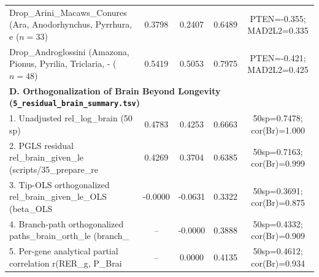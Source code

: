 \documentclass[9pt,a4paper]{article}
\begin{document}
\begin{longtable}{p{6.5cm}cccc}
Drop\_Arini\_Macaws\_Conures (Ara, Anodorhynchus, Pyrrhura, e ($n=33$) & 0.3798 & 0.2407 & 0.6489 & PTEN=-0.355; MAD2L2=0.335 \\
Drop\_Androglossini (Amazona, Pionus, Pyrilia, Triclaria, - ($n=48$) & 0.5419 & 0.5053 & 0.7975 & PTEN=-0.421; MAD2L2=0.425 \\
\midrule\multicolumn{5}{l}{\textbf{D. Orthogonalization of Brain Beyond Longevity (\texttt{5\_residual\_brain\_summary.tsv})}} \\
1. Unadjusted rel\_log\_brain (50 sp) & 0.4783 & 0.4253 & 0.6663 & 50sp=0.7478; cor(Br)=1.000 \\
2. PGLS residual rel\_brain\_given\_le (scripts/35\_prepare\_re & 0.4269 & 0.3704 & 0.6385 & 50sp=0.7163; cor(Br)=0.999 \\
3. Tip-OLS orthogonalized rel\_brain\_given\_le\_OLS (beta\_OLS & -0.0000 & -0.0631 & 0.3322 & 50sp=0.3691; cor(Br)=0.875 \\
4. Branch-path orthogonalized paths\_brain\_orth\_le (branch\_ & -- & -0.0000 & 0.3888 & 50sp=0.4332; cor(Br)=0.909 \\
5. Per-gene analytical partial correlation r(RER\_g, P\_Brai & -- & 0.0000 & 0.4135 & 50sp=0.4612; cor(Br)=0.934 \\
\bottomrule\end{longtable}\clearpage
\end{document}
